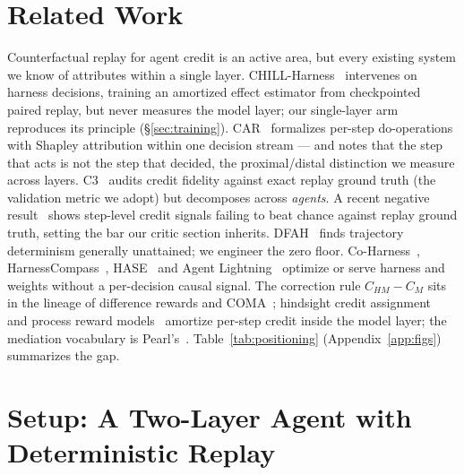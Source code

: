 \documentclass{article}
\theoremstyle{remark}
\begin{document}
\section{Related Work}
Counterfactual replay for agent credit is an active area, but every
existing system we know of attributes within a single layer.
CHILL-Harness~\citep{chill2026} intervenes on harness decisions, training
an amortized effect estimator from checkpointed paired replay, but never
measures the model layer; our single-layer arm reproduces its principle
(\S\ref{sec:training}). CAR~\citep{car2026} formalizes per-step
do-operations with Shapley attribution within one decision stream ---
and notes that the step that acts is not the step that decided, the
proximal/distal distinction we measure across layers. C3~\citep{c3v2}
audits credit fidelity against exact replay ground truth (the validation
metric we adopt) but decomposes across \emph{agents}. A recent negative
result~\citep{audit2026} shows step-level credit signals failing to beat
chance against replay ground truth, setting the bar our critic section
inherits. DFAH~\citep{dfah2026} finds trajectory determinism generally
unattained; we engineer the zero floor. Co-Harness~\citep{coharness2026},
HarnessCompass~\citep{harnesscompass2026}, HASE~\citep{hase2026} and
Agent Lightning~\citep{agentlightning} optimize or serve harness and
weights without a per-decision causal signal. The correction rule
$C_{HM}-C_M$ sits in the lineage of difference rewards and
COMA~\citep{wolpert2001,foerster2018}; hindsight credit
assignment~\citep{harutyunyan2019} and process reward
models~\citep{lightman2023} amortize per-step credit inside the model
layer; the mediation vocabulary is Pearl's~\citep{pearl2001direct}.
Table~\ref{tab:positioning} (Appendix~\ref{app:figs}) summarizes the
gap.

\section{Setup: A Two-Layer Agent with Deterministic Replay}
\label{sec:setup}
\end{document}
